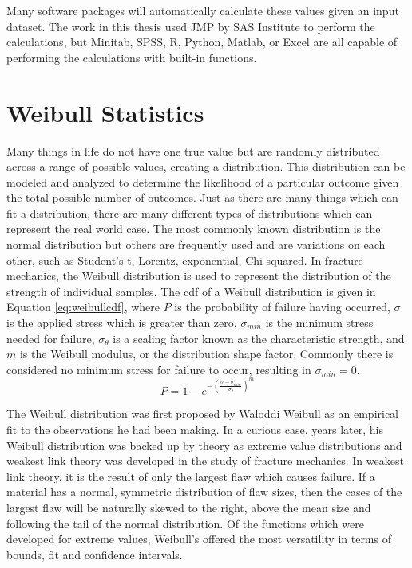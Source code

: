     Many software packages will automatically calculate these values given an input dataset.
    The work in this thesis used JMP by SAS Institute to perform the calculations, but Minitab, SPSS, R, Python, Matlab, or Excel are all capable of performing the calculations with built-in functions.

\section{Weibull Statistics}
    \label{app:weibull}
    Many things in life do not have one true value but are randomly distributed across a range of possible values, creating a distribution.
    This distribution can be modeled and analyzed to determine the likelihood of a particular outcome given the total possible number of outcomes.
    Just as there are many things which can fit a distribution, there are many different types of distributions which can represent the real world case.
    The most commonly known distribution is the normal distribution but others are frequently used and are variations on each other, such as Student's t, Lorentz, exponential, Chi-squared.
    In fracture mechanics, the Weibull distribution is used to represent the distribution of the strength of individual samples.
    The \gls{cdf} of a Weibull distribution is given in Equation \ref{eq:weibullcdf}, where $P$ is the probability of failure having occurred, $\sigma$ is the applied stress which is greater than zero, $\sigma_{min}$ is the minimum stress needed for failure, $\sigma_\theta$ is a scaling factor known as the characteristic strength, and $m$ is the Weibull modulus, or the distribution shape factor.
    Commonly there is considered no minimum stress for failure to occur, resulting in $\sigma_{min} = 0$.
    \begin{equation}
        \label{eq:weibullcdf}
        P=1-e^{-\left(\frac{\sigma - \sigma_{min}}{\sigma_\theta}\right)^m}
    \end{equation}

    The Weibull distribution was first proposed by Waloddi Weibull as an empirical fit to the observations he had been making.
    In a curious case, years later, his Weibull distribution was backed up by theory as extreme value distributions and weakest link theory was developed in the study of fracture mechanics.
    In weakest link theory, it is the result of only the largest flaw which causes failure.
    If a material has a normal, symmetric distribution of flaw sizes, then the cases of the largest flaw will be naturally skewed to the right, above the mean size and following the tail of the normal distribution.
    Of the functions which were developed for extreme values, Weibull's offered the most versatility in terms of bounds, fit and confidence intervals.

